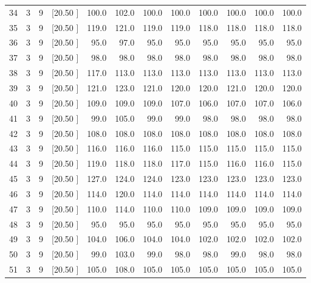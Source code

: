 \documentclass[12pt,a4paper]{article}
\begin{document}
\begin{center}
{\begin{tabular}{r r r r r r r r r r r r}
  34&  3&  9&[20.50     ]&   100.0&   102.0&   100.0&   100.0&   100.0&   100.0&   100.0&   100.0\\[-0.02in]
  35&  3&  9&[20.50     ]&   119.0&   121.0&   119.0&   119.0&   118.0&   118.0&   118.0&   118.0\\[-0.02in]
  36&  3&  9&[20.50     ]&    95.0&    97.0&    95.0&    95.0&    95.0&    95.0&    95.0&    95.0\\[-0.02in]
  37&  3&  9&[20.50     ]&    98.0&    98.0&    98.0&    98.0&    98.0&    98.0&    98.0&    98.0\\[-0.02in]
  38&  3&  9&[20.50     ]&   117.0&   113.0&   113.0&   113.0&   113.0&   113.0&   113.0&   113.0\\[-0.02in]
  39&  3&  9&[20.50     ]&   121.0&   123.0&   121.0&   120.0&   120.0&   121.0&   120.0&   120.0\\[-0.02in]
  40&  3&  9&[20.50     ]&   109.0&   109.0&   109.0&   107.0&   106.0&   107.0&   107.0&   106.0\\[-0.02in]
  41&  3&  9&[20.50     ]&    99.0&   105.0&    99.0&    99.0&    98.0&    98.0&    98.0&    98.0\\[-0.02in]
  42&  3&  9&[20.50     ]&   108.0&   108.0&   108.0&   108.0&   108.0&   108.0&   108.0&   108.0\\[-0.02in]
  43&  3&  9&[20.50     ]&   116.0&   116.0&   116.0&   115.0&   115.0&   115.0&   115.0&   115.0\\[-0.02in]
  44&  3&  9&[20.50     ]&   119.0&   118.0&   118.0&   117.0&   115.0&   116.0&   116.0&   115.0\\[-0.02in]
  45&  3&  9&[20.50     ]&   127.0&   124.0&   124.0&   123.0&   123.0&   123.0&   123.0&   123.0\\[-0.02in]
  46&  3&  9&[20.50     ]&   114.0&   120.0&   114.0&   114.0&   114.0&   114.0&   114.0&   114.0\\[-0.02in]
  47&  3&  9&[20.50     ]&   110.0&   114.0&   110.0&   110.0&   109.0&   109.0&   109.0&   109.0\\[-0.02in]
  48&  3&  9&[20.50     ]&    95.0&    95.0&    95.0&    95.0&    95.0&    95.0&    95.0&    95.0\\[-0.02in]
  49&  3&  9&[20.50     ]&   104.0&   106.0&   104.0&   104.0&   102.0&   102.0&   102.0&   102.0\\[-0.02in]
  50&  3&  9&[20.50     ]&    99.0&   103.0&    99.0&    98.0&    98.0&    99.0&    98.0&    98.0\\[-0.02in]
  51&  3&  9&[20.50     ]&   105.0&   108.0&   105.0&   105.0&   105.0&   105.0&   105.0&   105.0\\[-0.02in]

\end{tabular}}
\end{center}
\end{document}

